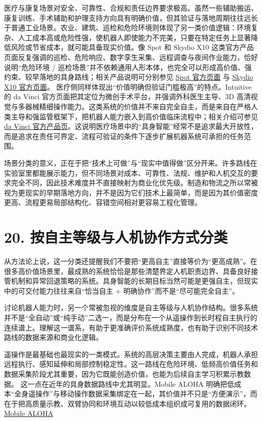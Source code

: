 医疗与康复场景对安全、可靠性、合规和责任边界要求极高。虽然一些辅助搬运、康复训练、手术辅助和护理支持方向具有明确价值，但其验证与落地周期往往远长于普通工业场景。农业、建筑、巡检和危险环境则体现了另一类价值逻辑：环境复杂、人工成本高或危险性强，使机器人即使能力不完美，只要在特定任务上显著降低风险或节省成本，就可能具备现实价值。像 Spot 和 Skydio X10 这类官方产品页面反复强调的巡检、危险响应、数字孪生采集、远程调查与夜间作业能力，恰好说明“危险环境 / 巡检场景”并不依赖通用人形本体，也完全可以形成高价值、强约束、较早落地的具身路线；相关产品说明可分别参见 \href{https://bostondynamics.com/products/spot/}{Spot 官方页面} 与 \href{https://www.skydio.com/x10/}{Skydio X10 官方页面}。 医疗侧同样体现出“价值明确但验证门槛极高”的特点。Intuitive 的 da Vinci 官方页面把其定位为微创手术平台，并强调外科医生主导、3D 高清视觉与多器械精细操作能力。这类系统的价值并不来自完全自主，而是来自在严格人类主导和强监管框架下，把机器人能力嵌入到高价值临床流程中；相关介绍可参见 \href{https://www.intuitive.com/en-us/products-and-services/da-vinci}{da Vinci 官方产品页}。这说明医疗场景中的“具身智能”经常不是追求最大开放性，而是追求在责任可界定、流程可验证的条件下逐步扩展机器系统可承担的任务范围。

场景分类的意义，正在于把“技术上可做”与“现实中值得做”区分开来。许多路线在实验室里都能展示能力，但不同场景对成本、可靠性、法规、维护和人机交互的要求完全不同，因此技术难度并不直接映射为商业化优先级。制造和物流之所以常被视为更现实的早期落地方向，并不是因为它们技术上最简单，而是因为其价值密度更高、流程更易局部结构化、容错空间相对更容易工程化管理。

\section*{20. 按自主等级与人机协作方式分类}

从方法论上说，这一分类还提醒我们不要把“更高自主”直接等价为“更高成熟”。在很多高价值场景里，最成熟的系统恰恰是那些清楚界定人机职责边界、具备良好接管机制和异常回退策略的系统。具身智能的长期目标当然可能是更强自主，但现实中的可交付能力往往来自“恰当自主 + 明确协作”而不是“尽可能完全自主”。

讨论机器人能力时，另一个常被忽视的维度是自主等级与人机协作结构。很多系统并不是“全自动”或“纯手动”二选一，而是分布在一个从遥操作到长时程自主执行的连续谱上。理解这一谱系，有助于更准确评价系统成熟度，也有助于识别不同技术路线的数据来源和商业化逻辑。

遥操作是最基础也最现实的一类模式。系统的高层决策主要由人完成，机器人承担远程执行、感知延伸和局部控制稳定性。这一路线在危险环境、低频高价值任务和数据采集阶段尤其重要，因为它既能创造价值，也能为后续自主学习积累示教数据。 这一点在近年的具身数据路线中尤其明显。Mobile ALOHA 明确把低成本“全身遥操作”与移动操作数据采集绑定在一起，其价值并不只是“方便演示”，而在于把高质量示教、双臂协同和环境互动以较低成本组织成可复用的数据闭环。\href{https://arxiv.org/abs/2401.02117}{Mobile ALOHA}

